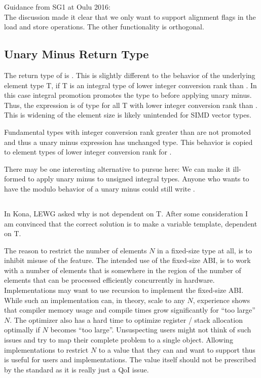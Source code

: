 Guidance from SG1 at Oulu 2016:\\
The discussion made it clear that we only want to support alignment flags in the load and store operations.
The other functionality is orthogonal.

\subsection{Unary Minus Return Type}\label{sec:unary minus}
The return type of  is .
This is slightly different to the behavior of the underlying element type \type T, if \type T is an integral type of lower integer conversion rank than \intt.
In this case integral promotion promotes the type to \intt before applying unary minus.
Thus, the expression  is of type \intt for all \type T with lower integer conversion rank than \intt.
This is widening of the element size is likely unintended for SIMD vector types.

Fundamental types with integer conversion rank greater than \intt are not promoted and thus a unary minus expression has unchanged type.
This behavior is copied to element types of lower integer conversion rank for \simd.

There may be one interesting alternative to pursue here:
We can make it ill-formed to apply unary minus to unsigned integral types.
Anyone who wants to have the modulo behavior of a unary minus could still write .

\subsection{}\label{sec:maxfixedsize}
In Kona, LEWG asked why  is not dependent on \type T.
After some consideration I am convinced that the correct solution is to make  a variable template, dependent on \type T.

The reason to restrict the number of elements $N$ in a fixed-size \simd type at all, is to inhibit misuse of the feature.
The intended use of the fixed-size ABI, is to work with a number of elements that is somewhere in the region of the number of elements that can be processed efficiently concurrently in hardware.
Implementations may want to use recursion to implement the fixed-size ABI.
While such an implementation can, in theory, scale to any $N$, experience shows that compiler memory usage and compile times grow significantly for “too large” $N$.
The optimizer also has a hard time to optimize register / stack allocation optimally if $N$ becomes “too large”.
Unsuspecting users might not think of such issues and try to map their complete problem to a single \simd object.
Allowing implementations to restrict $N$ to a value that they can and want to support thus is useful for users and implementations.
The value itself should not be prescribed by the standard as it is really just a QoI issue.

